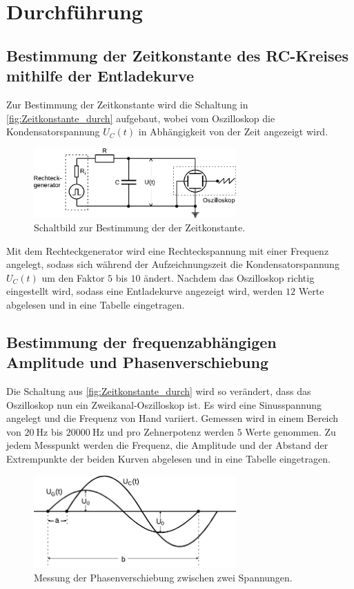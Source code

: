 \section{Durchführung}
\label{sec:Durchführung}

\subsection{Bestimmung der Zeitkonstante des RC-Kreises mithilfe der Entladekurve} %
\label{sub:Entladekurve_durch}
Zur Bestimmung der Zeitkonstante wird die Schaltung in \autoref{fig:Zeitkonstante_durch} aufgebaut,
wobei vom Oszilloskop die Kondensatorspannung $U_C(t)$ in Abhängigkeit von der Zeit angezeigt wird.
\begin{figure}[H]
    \centering
    \includegraphics[width=0.69\textwidth]{build/Abb_3.pdf}
    \caption{Schaltbild zur Bestimmung der der Zeitkonstante.\cite{v353}}
    \label{fig:Entladekurve_durch}
\end{figure}
\noindent Mit dem Rechteckgenerator wird eine Rechteckspannung mit einer Frequenz angelegt, sodass sich während der Aufzeichnungszeit die Kondensatorspannung $U_C(t)$ um den Faktor $5$ bis $10$ ändert.
Nachdem das Oszilloskop richtig eingestellt wird, sodass eine Entladekurve angezeigt wird, werden $12$ Werte abgelesen und in eine Tabelle eingetragen. 
\subsection{Bestimmung der frequenzabhängigen Amplitude und Phasenverschiebung} %
\label{sub:Freque_A&P_durch}
\noindent Die Schaltung aus \autoref{fig:Zeitkonstante_durch} wird so verändert, dass das Oszilloskop nun ein Zweikanal-Oszilloskop ist.
Es wird eine Sinusspannung angelegt und die Frequenz von Hand variiert.
Gemessen wird in einem Bereich von $\qty{20}{\hertz}$ bis $\qty{20000}{\hertz}$ und pro Zehnerpotenz werden $5$ Werte genommen.
Zu jedem Messpunkt werden die Frequenz, die Amplitude und der Abstand der Extrempunkte der beiden Kurven abgelesen und in eine Tabelle eingetragen.
\begin{figure}[H]
    \centering
    \includegraphics[width=0.69\textwidth]{build/Abb_7_edit.pdf}
    \caption {Messung der Phasenverschiebung zwischen zwei Spannungen.\cite{v353}}
    \label{fig:Freque_A&P_durch}
\end{figure}
